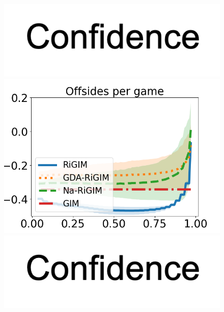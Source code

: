 \documentclass[letterpaper]{article} %
\begin{document}
\begin{figure}[htbp]
\begin{minipage}{0.16\textwidth}
    \vspace{-0.05in}
    \includegraphics[scale=0.12]{figures/confidence_x_label.png}
    \end{minipage}
    \begin{minipage}{0.16\textwidth}
    \centering
    \includegraphics[scale=0.16]{figures/soccer_risk_curve_Offsides_shadow.png}\par
    \vspace{-0.05in}
    \includegraphics[scale=0.12]{figures/confidence_x_label.png}
    \end{minipage}
    \begin{minipage}{0.16\textwidth}
    \centering

\end{minipage}
\end{figure}
\end{document}
